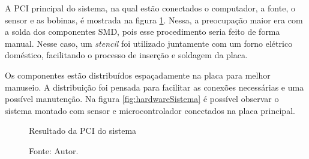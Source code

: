 A PCI principal do sistema, na qual estão conectados o computador, a fonte, o sensor e as bobinas, é mostrada na figura \ref{fig:pbcMain}. Nessa, a preocupação maior era com a solda dos componentes SMD, pois esse procedimento seria feito de forma manual. Nesse caso, um \textit{stencil} foi utilizado juntamente com um forno elétrico doméstico, facilitando o processo de inserção e soldagem da placa.

Os componentes estão distribuídos espaçadamente na placa para melhor manuseio. A distribuição foi pensada para facilitar as conexões necessárias e uma possível manutenção. Na figura \ref{fig:hardwareSistema} é possível observar o sistema montado com sensor e microcontrolador conectados na placa principal.

\begin{figure}[H]
    \centering
     \caption{Resultado da PCI do sistema}
     \caption*{Fonte: Autor.}\label{fig:pbcMain}
\end{figure}

